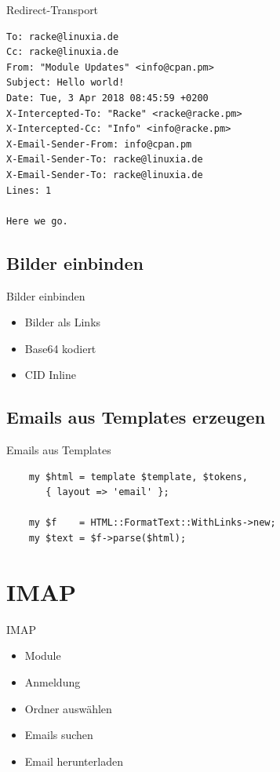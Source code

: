 \begin{frame}[fragile]{Redirect-Transport}
\begin{lstlisting}
To: racke@linuxia.de
Cc: racke@linuxia.de
From: "Module Updates" <info@cpan.pm>
Subject: Hello world!
Date: Tue, 3 Apr 2018 08:45:59 +0200
X-Intercepted-To: "Racke" <racke@racke.pm>
X-Intercepted-Cc: "Info" <info@racke.pm>
X-Email-Sender-From: info@cpan.pm
X-Email-Sender-To: racke@linuxia.de
X-Email-Sender-To: racke@linuxia.de
Lines: 1

Here we go.
\end{lstlisting}
\end{frame}

\subsection{Bilder einbinden}

\begin{frame}{Bilder einbinden}
  \begin{itemize}
  \item Bilder als Links
  \item Base64 kodiert
  \item CID Inline
  \end{itemize}
\end{frame}


\subsection{Emails aus Templates erzeugen}

\begin{frame}[fragile]{Emails aus Templates}
  \begin{verbatim}
    my $html = template $template, $tokens,
       { layout => 'email' };

    my $f    = HTML::FormatText::WithLinks->new;
    my $text = $f->parse($html);
  \end{verbatim}
\end{frame}

\section{IMAP}

\begin{frame}{IMAP}
  \begin{itemize}
  \item Module
  \item Anmeldung
  \item Ordner auswählen
  \item Emails suchen
  \item Email herunterladen
  \end{itemize}
\end{frame}

